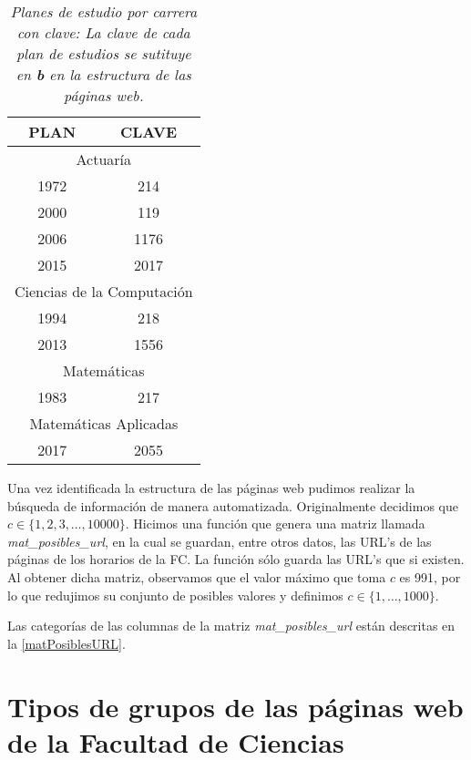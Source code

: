 \begin{table}[h]
\centering
\begin{tabular}{|c|c|}
 \hline 
  \textbf{PLAN} & \textbf{CLAVE} \\ 
 \hline 
 \multicolumn{2}{|c|}{Actuaría} \\ 
 \hline 
 1972 & 214 \\ 
 \hline 
 2000 & 119 \\ 
 \hline 
 2006 & 1176 \\ 
 \hline 
 2015 & 2017 \\ 
 \hline 
 \multicolumn{2}{|c|}{Ciencias de la Computación} \\ 
 \hline 
 1994 & 218 \\ 
 \hline 
 2013 & 1556 \\ 
 \hline 
 \multicolumn{2}{|c|}{Matemáticas} \\ 
 \hline 
 1983 & 217 \\ 
 \hline 
 \multicolumn{2}{|c|}{Matemáticas Aplicadas} \\ 
 \hline 
 2017 & 2055 \\ 
 \hline 
 \end{tabular}
\caption[\textit{Planes de estudio por carrera con clave}]{\textit{Planes de estudio por carrera con clave: La clave de cada plan de estudios se sutituye en \textbf{b} en la estructura de las páginas web.}}\label{PlanesEstudio}
\end{table}

Una vez identificada la estructura de las páginas web pudimos realizar la búsqueda de información de manera automatizada. Originalmente decidimos que $c \in \{1,2,3, \ldots, 10 000\}$. Hicimos una función que genera una matriz llamada \textit{mat\_posibles\_url}, en la cual se guardan, entre otros datos, las URL's de las páginas de los horarios de la FC. La función sólo guarda las URL's que si existen. Al obtener dicha matriz, observamos que el valor máximo que toma $c$ es 991, por lo que redujimos su conjunto de posibles valores y definimos $c \in \{1, \ldots, 1 000\}$.

Las categorías de las columnas de la matriz \textit{mat\_posibles\_url} están descritas en la \tablename{\ref{matPosiblesURL}}.

\dfNmatrizChica %


\section{Tipos de grupos de las páginas web de la Facultad de Ciencias} \label{TiposDeGpos}

